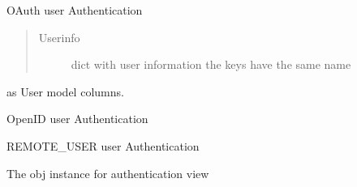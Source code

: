 \documentclass[letterpaper,10pt,english]{sphinxmanual}
\begin{document}
\begin{fulllineitems}
\begin{fulllineitems}
\label{api:flask.ext.appbuilder.security.manager.BaseSecurityManager.auth_user_oauth}
OAuth user Authentication
\begin{quote}\begin{description}
\item[{Userinfo}] \leavevmode
dict with user information the keys have the same name

\end{description}\end{quote}

as User model columns.

\end{fulllineitems}


\begin{fulllineitems}
\label{api:flask.ext.appbuilder.security.manager.BaseSecurityManager.auth_user_oid}
OpenID user Authentication
\begin{quote}\begin{description}
\end{description}\end{quote}

\end{fulllineitems}


\begin{fulllineitems}
\label{api:flask.ext.appbuilder.security.manager.BaseSecurityManager.auth_user_remote_user}
REMOTE\_USER user Authentication
\begin{quote}\begin{description}
\end{description}\end{quote}

\end{fulllineitems}


\begin{fulllineitems}
\label{api:flask.ext.appbuilder.security.manager.BaseSecurityManager.auth_view}
The obj instance for authentication view


\end{fulllineitems}
\end{fulllineitems}
\end{document}
